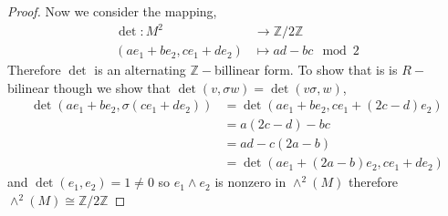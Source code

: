 \documentclass[11pt]{article}
\newcommand{\zz}{\mathbb Z}   %
\begin{document}
\begin{proof}
    Now we consider the mapping,
    \begin{align*}
        \det: M^{2} &\to \zz/2\zz \\
        (ae_1 + be_2, ce_1 + de_2) &\mapsto ad - bc \mod 2
    \end{align*}
    Therefore $\det$ is an alternating $\zz-$billinear form. To show that is is $R-$bilinear though we show that $\det(v,\sigma w) = \det(v\sigma, w)$,
    \begin{align*}
        \det(ae_1+ be_2, \sigma(ce_1 + de_2)) &= \det(ae_1 + be_2, ce_1 + (2c -d)e_2) \\
        &= a(2c - d) - bc \\
        &= ad - c(2a-b) \\
        &= \det(ae_1 + (2a-b)e_2, ce_1 + de_2) 
    \end{align*}
    and $\det(e_1,e_2) = 1\neq 0$ so $e_1\wedge e_2$ is nonzero in $\wedge^{2}(M)$ therefore $\wedge^{2}(M) \cong \zz/2\zz$
    
\end{proof}

\vspace*{15pt}
\end{document}
